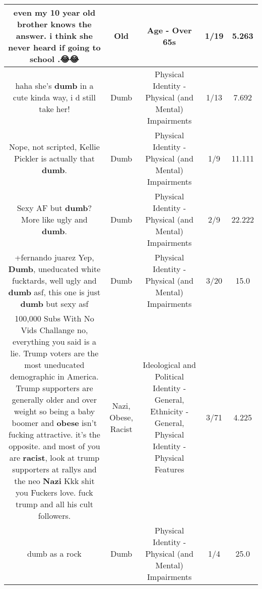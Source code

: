 \documentclass[11pt]{article}
\newlength\mylength
\begin{document}
\begin{center}
\begin{longtable}{|C{.65\mylength}|C{.30\mylength}|C{.12\mylength}|C{.12\mylength}|C{.12\mylength}|}
  \small even my 10 year \textbf{old} brother knows the answer. i think she  never heard if going to  school .😂😂\normalsize   & Old & Age - Over 65s & 1/19 & 5.263 \\  \hline
  \small haha she's \textbf{dumb} in a cute kinda way, i d still take her!\normalsize   & Dumb & Physical Identity - Physical (and Mental) Impairments & 1/13 & 7.692 \\  \hline
  \small Nope, not scripted, Kellie Pickler is actually that \textbf{dumb}.\normalsize   & Dumb & Physical Identity - Physical (and Mental) Impairments & 1/9 & 11.111 \\  \hline
  \small Sexy AF but \textbf{dumb}?More like ugly and \textbf{dumb}.\normalsize   & Dumb & Physical Identity - Physical (and Mental) Impairments & 2/9 & 22.222 \\  \hline
  \small +fernando juarez Yep, \textbf{Dumb}, uneducated white fucktards, well ugly and \textbf{dumb} asf, this one is just \textbf{dumb} but sexy asf\normalsize   & Dumb & Physical Identity - Physical (and Mental) Impairments & 3/20 & 15.0 \\  \hline
  \small 100,000 Subs With No Vids Challange no, everything you said is a lie. Trump voters are the most uneducated demographic in America. Trump supporters are generally older and over weight so being a baby boomer and \textbf{obese} isn't fucking attractive. it's the opposite. and most of you are \textbf{racist}, look at trump supporters at rallys and the neo \textbf{Nazi} Kkk shit you Fuckers love. fuck trump and all his cult followers.\normalsize   & Nazi, Obese, Racist &  Ideological and Political Identity - General, Ethnicity - General, Physical Identity - Physical Features & 3/71 & 4.225 \\  \hline
  \small dumb as a rock\normalsize   & Dumb & Physical Identity - Physical (and Mental) Impairments & 1/4 & 25.0 \\  \hline

\end{longtable}
\end{center}
\end{document}
